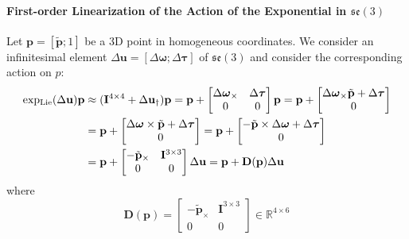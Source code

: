 \paragraph{First-order Linearization of the Action of the Exponential in $\mathfrak{se}(3)$}
Let $\mathbf{p}=[\tilde{\mathbf{p}};1]$ be a 3D point in homogeneous coordinates. We consider an infinitesimal element $\Delta \mathbf{u}=[\Delta \boldsymbol{\omega};\Delta \boldsymbol{\tau}]$ of $\mathfrak{se}(3)$ and consider the corresponding action on $p$:
\begin{equation}\label{eq:lieactionlinearisation}
\begin{split}
\operatorname{exp_{Lie}}(\Delta \mathbf{u})\mathbf{p} &\approx (\mathbf{I}^{4\times4}+\Delta \mathbf{u}_\dagger)\mathbf{p} = \mathbf{p} +
\begin{bmatrix}
\Delta \boldsymbol{\omega}_\times & \Delta \boldsymbol{\tau} \\
0  & 0
\end{bmatrix} \mathbf{p}
= \mathbf{p} +
\begin{bmatrix}
\Delta \boldsymbol{\omega}_\times \tilde{\mathbf{p}}+\Delta \boldsymbol{\tau} \\
0
\end{bmatrix} \\
&= \mathbf{p} +
\begin{bmatrix}
\Delta \boldsymbol{\omega} \times \tilde{\mathbf{p}}+\Delta \boldsymbol{\tau} \\
0
\end{bmatrix}
= \mathbf{p} +
\begin{bmatrix}
-\tilde{\mathbf{p}} \times \Delta \boldsymbol{\omega} + \Delta \boldsymbol{\tau} \\
0
\end{bmatrix} \\
&= \mathbf{p} +
\begin{bmatrix}
-\tilde{\mathbf{p}}_\times & \mathbf{I}^{3\times3} \\
0 & 0
\end{bmatrix} \Delta \mathbf{u}
= \mathbf{p} + \mathbf{D}(\mathbf{p})\Delta \mathbf{u}
\end{split}
\end{equation}
where
\begin{equation}
\mathbf{D}(\mathbf{p}) = 
\begin{bmatrix}
-\tilde{\mathbf{p}}_\times & \mathbf{I}^{3\times3} \\
0 & 0
\end{bmatrix} \in \mathbb{R}^{4\times6}
\end{equation}

